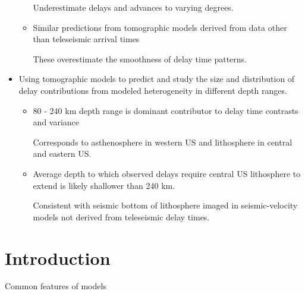 \documentclass[letterpaper,10pt]{article}
\begin{document}
\begin{itemize}
\begin{itemize}
          Underestimate delays and advances to varying degrees. 
          \item Similar predictions from tomographic models derived from data other than teleseismic arrival times 

          These overestimate the smoothness of delay time patterns. 
        \end{itemize}
  \item Using tomographic models to predict and study the size and distribution of delay contributions from modeled heterogeneity in different depth ranges. 
        \begin{itemize}
          \item 80 - 240 km depth range is dominant contributor to delay time contrasts and variance

                Corresponds to asthenosphere in western US and lithosphere in central and eastern US. 
          \item Average depth to which observed delays require central US lithosphere to extend is likely shallower than 240 km.

                Consistent with seismic bottom of lithosphere imaged in seismic-velocity models not derived from teleseismic delay times. 
        \end{itemize}
\end{itemize}



\section{Introduction}

Common features of models 




















\end{document}
